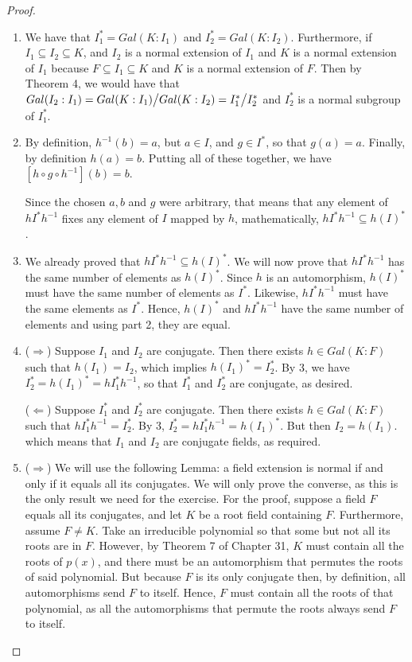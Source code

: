 \begin{proof}
 \begin{enumerate}
     \item We have that $I_1^\ast=Gal(K:I_1)$ and $I_2^\ast=Gal(K:I_2)$. Furthermore, if $I_1\subseteq I_2\subseteq K$, and $I_2$ is a normal extension of $I_1$ and $K$ is a normal extension of $I_1$ because $F\subseteq I_1\subseteq K$ and $K$ is a normal extension of $F$. Then by Theorem 4, we would have that $Gal(I_2:I_1)={\textstyle Gal(K:I_1)}\big/{\textstyle Gal(K:I_2)}={\textstyle I_1^\ast}\big/{\textstyle I_2^\ast}$ and $I_2^\ast$ is a normal subgroup of $I_1^\ast$.
     \item By definition, $h^{-1}(b)=a$, but $a\in I$, and $g\in I^\ast$, so that $g(a)=a$. Finally, by definition $h(a)=b$. Putting all of these together, we have $[h\circ g\circ h^{-1}](b)=b$. 

     Since the chosen $a, b$ and $g$ were arbitrary, that means that any element of $hI^\ast h^{-1}$ fixes any element of $I$ mapped by $h$, mathematically, $hI^\ast h^{-1}\subseteq h(I)^\ast$.
     \item We already proved that $hI^\ast h^{-1}\subseteq h(I)^\ast$. We will now prove that $hI^\ast h^{-1}$ has the same number of elements as $h(I)^\ast$. Since $h$ is an automorphism, $h(I)^\ast$ must have the same number of elements as $I^\ast$. Likewise, $hI^\ast h^{-1}$ must have the same elements as $I^\ast$. Hence, $h(I)^\ast$ and $hI^\ast h^{-1}$ have the same number of elements and using part 2, they are equal.
     \item ($\Rightarrow$) Suppose $I_1$ and $I_2$ are conjugate. Then there exists $h\in Gal(K:F)$ such that $h(I_1)=I_2$, which implies $h(I_1)^\ast=I_2^\ast$. By 3, we have $I_2^\ast= h(I_1)^\ast= hI_1^\ast h^{-1}$, so that $I_1^\ast$ and $I_2^\ast$ are conjugate, as desired.

     ($\Leftarrow$) Suppose $I_1^\ast$ and $I_2^\ast$ are conjugate. Then there exists $h\in Gal(K:F)$ such that $hI_1^\ast h^{-1}=I_2^\ast$. By 3, $I_2^\ast= hI_1^\ast h^{-1}= h(I_1)^\ast$. But then $I_2=h(I_1)$. which means that $I_1$ and $I_2$ are conjugate fields, as required.
    \item ($\Rightarrow$) We will use the following Lemma: a field extension is normal if and only if it equals all its conjugates. We will only prove the converse, as this is the only result we need for the exercise. For the proof, suppose a field $F$ equals all its conjugates, and let $K$ be a root field containing $F$. Furthermore, assume $F\neq K$. Take an irreducible polynomial so that some but not all its roots are in $F$. However, by Theorem 7 of Chapter 31, $K$ must contain all the roots of $p(x)$, and there must be an automorphism that permutes the roots of said polynomial. But because $F$ is its only conjugate then, by definition, all automorphisms send $F$ to itself. Hence, $F$ must contain all the roots of that polynomial, as all the automorphisms that permute the roots always send $F$ to itself. 


\end{enumerate}
\end{proof}
